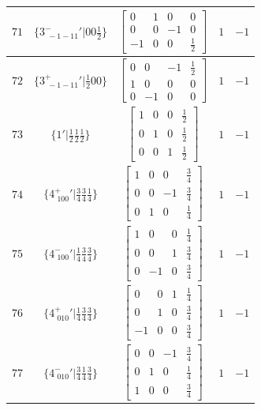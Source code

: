 \documentclass[fleqn,8pt]{jsarticle}
\begin{document}
\begin{longtable}{ccccc}
$ 71 $ & $ \{3^{-}_{\,\,-1-11}{}'|0 0 \frac{1}{2}\} $ & $ \begin{bmatrix} 0 & 1 & 0 & 0 \\ 0 & 0 & -1 & 0 \\ -1 & 0 & 0 & \frac{1}{2} \end{bmatrix} $ & $ 1 $ & $ -1 $ \\ \hline
$ 72 $ & $ \{3^{+}_{\,\,-1-11}{}'|\frac{1}{2} 0 0\} $ & $ \begin{bmatrix} 0 & 0 & -1 & \frac{1}{2} \\ 1 & 0 & 0 & 0 \\ 0 & -1 & 0 & 0 \end{bmatrix} $ & $ 1 $ & $ -1 $ \\ \hline
$ 73 $ & $ \{1{}'|\frac{1}{2} \frac{1}{2} \frac{1}{2}\} $ & $ \begin{bmatrix} 1 & 0 & 0 & \frac{1}{2} \\ 0 & 1 & 0 & \frac{1}{2} \\ 0 & 0 & 1 & \frac{1}{2} \end{bmatrix} $ & $ 1 $ & $ -1 $ \\ \hline
$ 74 $ & $ \{4^{+}_{\,\,100}{}'|\frac{3}{4} \frac{3}{4} \frac{1}{4}\} $ & $ \begin{bmatrix} 1 & 0 & 0 & \frac{3}{4} \\ 0 & 0 & -1 & \frac{3}{4} \\ 0 & 1 & 0 & \frac{1}{4} \end{bmatrix} $ & $ 1 $ & $ -1 $ \\ \hline
$ 75 $ & $ \{4^{-}_{\,\,100}{}'|\frac{1}{4} \frac{3}{4} \frac{3}{4}\} $ & $ \begin{bmatrix} 1 & 0 & 0 & \frac{1}{4} \\ 0 & 0 & 1 & \frac{3}{4} \\ 0 & -1 & 0 & \frac{3}{4} \end{bmatrix} $ & $ 1 $ & $ -1 $ \\ \hline
$ 76 $ & $ \{4^{+}_{\,\,010}{}'|\frac{1}{4} \frac{3}{4} \frac{3}{4}\} $ & $ \begin{bmatrix} 0 & 0 & 1 & \frac{1}{4} \\ 0 & 1 & 0 & \frac{3}{4} \\ -1 & 0 & 0 & \frac{3}{4} \end{bmatrix} $ & $ 1 $ & $ -1 $ \\ \hline
$ 77 $ & $ \{4^{-}_{\,\,010}{}'|\frac{3}{4} \frac{1}{4} \frac{3}{4}\} $ & $ \begin{bmatrix} 0 & 0 & -1 & \frac{3}{4} \\ 0 & 1 & 0 & \frac{1}{4} \\ 1 & 0 & 0 & \frac{3}{4} \end{bmatrix} $ & $ 1 $ & $ -1 $ \\ \hline

\end{longtable}
\end{document}
